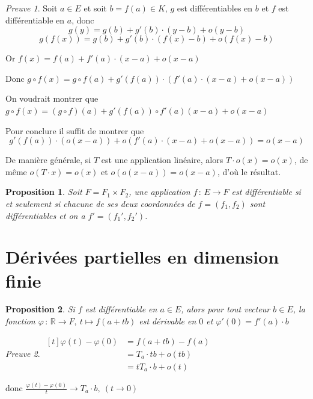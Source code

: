 \documentclass[]{article}
\newtheorem{myproposition}{Proposition}
\theoremstyle{remark}
\newtheorem{myproof}{Preuve}
\theoremstyle{definition}
\newcommand{\funcinline}[5]{
#1 \, : \, #2 \longrightarrow #3, ~ #4 \longmapsto #5
}
\newcommand{\funcshort}[3]{
#1 \, : \, #2 \longrightarrow #3
}
\begin{document}
\begin{myproof}
	Soit $a \in E$ et soit $b= f(a) \in K$, $g$ est différentiables en $b$ et $f$ est différentiable en $a$, donc $$g(y) = g(b) + g'(b) \cdot (y - b) + o(y - b)$$
	$$g(f(x)) = g(b) + g'(b)\cdot(f(x) - b) + o(f(x)-b)$$
	
	Or $f(x) = f(a) + f'(a) \cdot (x-a) + o(x-a)$
	
	Donc $g \circ f(x) = g \circ f(a) + g'(f(a)) \cdot (f'(a) \cdot(x-a)+ o(x-a))$
	
	On voudrait montrer que $g \circ f(x) = (g \circ f)(a) + g'(f(a)) \circ f'(a)(x-a) + o(x-a)$
	
	Pour conclure il suffit de montrer que $$g'(f(a)) \cdot (o(x-a)) + o(f'(a) \cdot (x-a) + o(x-a)) = o(x-a)$$
	
	De manière générale, si $T$ est une application linéaire, alors $T \cdot o(x) = o(x)$, de même $o(T \cdot x) = o(x)$ et $o(o(x-a)) = o(x-a)$, d'où le résultat.
\end{myproof}

\begin{myproposition}
	Soit $F = F_1 \times F_2$, une application $\funcshort{f}{E}{F}$ est différentiable si et seulement si chacune de ses deux coordonnées de $f=(f_1,f_2)$ sont différentiables et on a $f'=(f_1', f_2')$.
\end{myproposition}

\section{Dérivées partielles en dimension finie}

\begin{myproposition}
	Si $f$ est différentiable en $a \in E$, alors pour tout vecteur $b \in E$, la fonction $\funcinline{\varphi}{\mathbb{R}}{F}{t}{f(a+tb)}$ est dérivable en $0$ et $\varphi'(0) = f'(a) \cdot b$ 
\end{myproposition}

\begin{myproof}
	
	\leavevmode
	
	$
	\begin{aligned}[t]
		\varphi(t) - \varphi(0) &= f(a+tb) - f(a)\\
		&=T_a \cdot tb + o(tb)\\
		&=t T_a \cdot b + o(t)
	\end{aligned}
	$
	
	donc $\displaystyle \frac{\varphi(t) - \varphi(0)}{t} \longrightarrow T_a \cdot b, ~ (t \to 0)$
\end{myproof}
\end{document}
